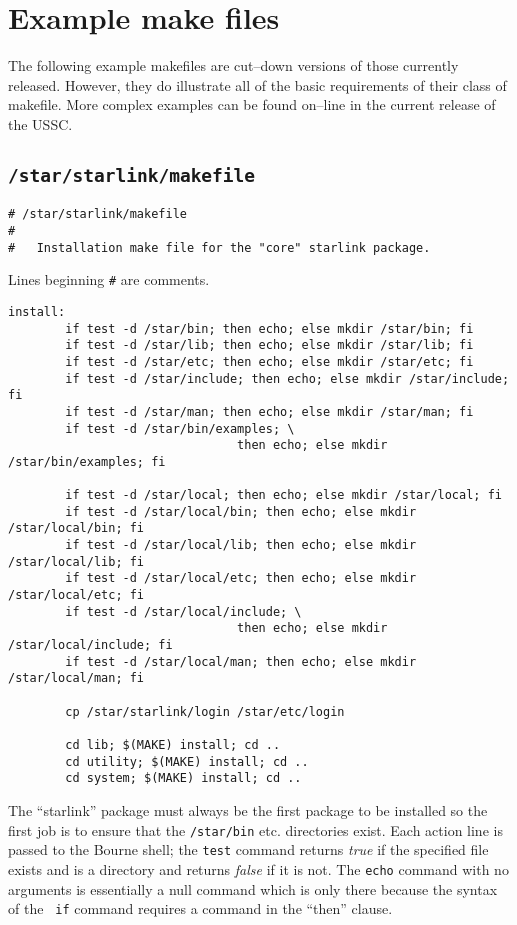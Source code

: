 \appendix
\section{Example make files}

The following example makefiles are cut--down versions of those currently 
released. However, they do illustrate all of the basic requirements of
their class of makefile. More complex examples can be found on--line in 
the current release of the USSC. 


\subsection{\tt /star/starlink/makefile}
\begin{verbatim}
# /star/starlink/makefile
#
#   Installation make file for the "core" starlink package.
\end{verbatim}
Lines beginning {\tt\#} are comments. 
\begin{verbatim}
install:
        if test -d /star/bin; then echo; else mkdir /star/bin; fi
        if test -d /star/lib; then echo; else mkdir /star/lib; fi
        if test -d /star/etc; then echo; else mkdir /star/etc; fi
        if test -d /star/include; then echo; else mkdir /star/include; fi
        if test -d /star/man; then echo; else mkdir /star/man; fi
        if test -d /star/bin/examples; \
                                then echo; else mkdir /star/bin/examples; fi

        if test -d /star/local; then echo; else mkdir /star/local; fi
        if test -d /star/local/bin; then echo; else mkdir /star/local/bin; fi
        if test -d /star/local/lib; then echo; else mkdir /star/local/lib; fi
        if test -d /star/local/etc; then echo; else mkdir /star/local/etc; fi
        if test -d /star/local/include; \
                                then echo; else mkdir /star/local/include; fi
        if test -d /star/local/man; then echo; else mkdir /star/local/man; fi
 
        cp /star/starlink/login /star/etc/login

        cd lib; $(MAKE) install; cd ..
        cd utility; $(MAKE) install; cd ..
        cd system; $(MAKE) install; cd ..

\end{verbatim}
The ``starlink'' package must always be the first package to be installed so
the first job is to ensure that the {\tt /star/bin} etc. directories exist.
Each action line is passed to the Bourne shell; the {\tt test} command
returns {\em true} if the specified file exists and is a directory and returns
{\em false} if it is not. The {\tt echo} command with no arguments is
essentially a null command which is only there because the syntax of the {\tt
if} command requires a command in the ``then'' clause.


